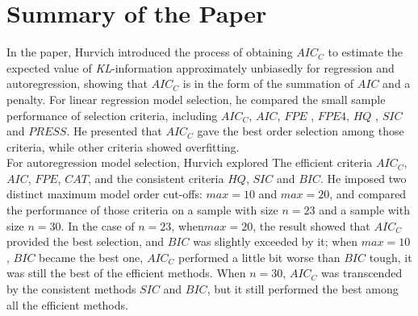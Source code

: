 \section{Summary of the Paper}

In the paper, Hurvich introduced the process of obtaining $AIC_C$ to estimate the expected value of \textit{KL}-information approximately unbiasedly for regression and autoregression, showing that $AIC_C$ is in the form of the summation of $AIC$ and a penalty. For linear regression model selection, he compared the small sample performance of selection criteria, including $AIC_C$, $AIC$, $FPE$ \cite{akaike1970statistical}, $FPE4$\cite{bhansali1977some}, $HQ$ \cite{hannan1979determination}, $SIC$\cite{schwarz1978estimating} and $PRESS$\cite{allen1974relationship}. He presented that $AIC_C$ gave the best order selection among those criteria, while other criteria showed overfitting.\\

For autoregression model selection, Hurvich explored The efficient criteria $AIC_C$, $AIC$, $FPE$\cite{shibata1980asymptotically}, $CAT$\cite{bhansali1986asymptotically}, and the consistent criteria $HQ$, $SIC$ and $BIC$. He imposed two distinct maximum model order cut-offs: $max = 10$ and $max = 20$, and compared the performance of those criteria on a sample with size $n=23$ and a sample with size $n =30$. In the case of $n=23$, when$ max =20$, the result showed that $AIC_C$ provided the best selection, and $BIC$ was slightly exceeded by it; when $max = 10$, $BIC$ became the best one, $AIC_C$ performed a little bit worse than $BIC$ tough, it was still the best of the efficient methods. When $n = 30$, $AIC_C$ was transcended by the consistent methods $SIC$ and $BIC$, but it still performed the best among all the efficient methods.